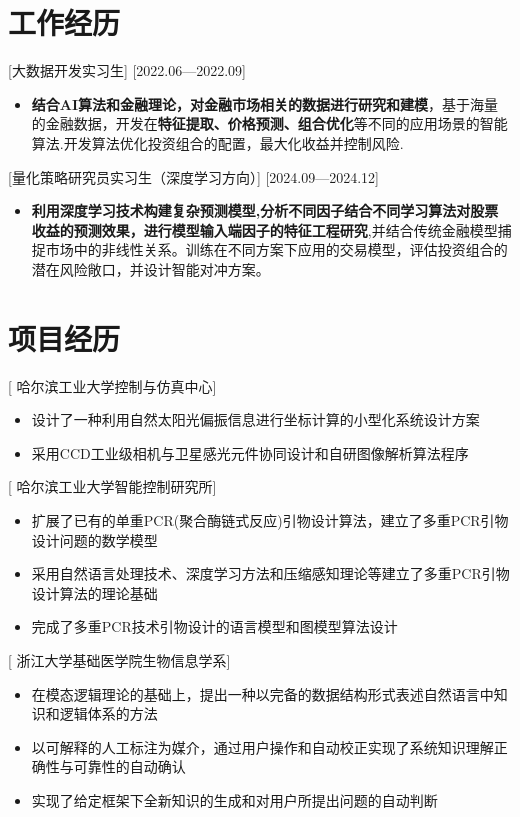 \documentclass{resume}
\begin{document}
\section{\textbf{工作经历}}

[大数据开发实习生]
[2022.06—2022.09] 

\begin{itemize}
  \item \textbf{结合AI算法和金融理论，对金融市场相关的数据进行研究和建模}，基于海量的金融数据，开发在\textbf{特征提取、价格预测、组合优化}等不同的应用场景的智能算法.开发算法优化投资组合的配置，最大化收益并控制风险.
\end{itemize}
[量化策略研究员实习生（深度学习方向）]
[2024.09—2024.12] 

\begin{itemize}
  \item \textbf{利用深度学习技术构建复杂预测模型,分析不同因子结合不同学习算法对股票收益的预测效果，进行模型输入端因子的特征工程研究},并结合传统金融模型捕捉市场中的非线性关系。训练在不同方案下应用的交易模型，评估投资组合的潜在风险敞口，并设计智能对冲方案。
\end{itemize}


\section{\textbf{项目经历}}
[ 哈尔滨工业大学控制与仿真中心]
\begin{itemize}
  \item 设计了一种利用自然太阳光偏振信息进行坐标计算的小型化系统设计方案
  \item 采用CCD工业级相机与卫星感光元件协同设计和自研图像解析算法程序
\end{itemize}

[ 哈尔滨工业大学智能控制研究所]
\begin{itemize}
  \item 扩展了已有的单重PCR(聚合酶链式反应)引物设计算法，建立了多重PCR引物设计问题的数学模型
  \item 采用自然语言处理技术、深度学习方法和压缩感知理论等建立了多重PCR引物设计算法的理论基础
  \item 完成了多重PCR技术引物设计的语言模型和图模型算法设计
\end{itemize}


[ 浙江大学基础医学院生物信息学系]
\begin{itemize}
  \item 在模态逻辑理论的基础上，提出一种以完备的数据结构形式表述自然语言中知识和逻辑体系的方法
  \item 以可解释的人工标注为媒介，通过用户操作和自动校正实现了系统知识理解正确性与可靠性的自动确认
  \item 实现了给定框架下全新知识的生成和对用户所提出问题的自动判断
\end{itemize}
\end{document}

